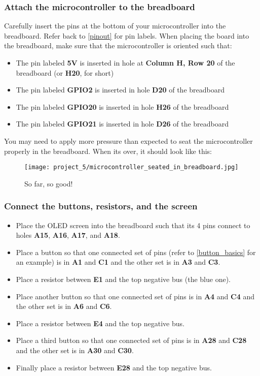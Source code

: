 \subsubsection{Attach the microcontroller to the breadboard}
Carefully insert the pins at the bottom of your microcontroller into the breadboard. Refer back to \ref{pinout} for pin labels.
When placing the board into the breadboard, make sure that the microcontroller is oriented such that:
\begin{itemize}
    \item The pin labeled \textbf{5V} is inserted in hole at \textbf{Column H, Row 20} of the breadboard (or \textbf{H20}, for short)
    \item The pin labeled \textbf{GPIO2} is inserted in hole \textbf{D20} of the breadboard
    \item The pin labeled \textbf{GPIO20} is inserted in hole \textbf{H26} of the breadboard
    \item The pin labeled \textbf{GPIO21} is inserted in hole \textbf{D26} of the breadboard
\end{itemize}
You may need to apply more pressure than expected to seat the microcontroller properly in the breadboard. When its over, it should look like this:
\begin{figure}[H]
    \centering
    \texttt{[image: project\_5/microcontroller\_seated\_in\_breadboard.jpg]}
    \caption{So far, so good!}
\end{figure}

\subsubsection{Connect the buttons, resistors, and the screen}
\begin{itemize}
    \item Place the OLED screen into the breadboard such that its 4 pins connect to holes \textbf{A15}, \textbf{A16}, \textbf{A17}, and \textbf{A18}.
    \item Place a button so that one connected set of pins (refer to \ref{button_basics} for an example) is in \textbf{A1}
    and \textbf{C1} and the other set is in \textbf{A3} and \textbf{C3}.
    \item Place a resistor between \textbf{E1} and the top negative bus (the blue one).
    \item Place another button so that one connected set of pins is in \textbf{A4} and \textbf{C4}
    and the other set is in \textbf{A6} and \textbf{C6}.
    \item Place a resistor between \textbf{E4} and the top negative bus.
    \item Place a third button so that one connected set of pins is in \textbf{A28} and \textbf{C28}
    and the other set is in \textbf{A30} and \textbf{C30}.
    \item Finally place a resistor between \textbf{E28} and the top negative bus.
\end{itemize}


